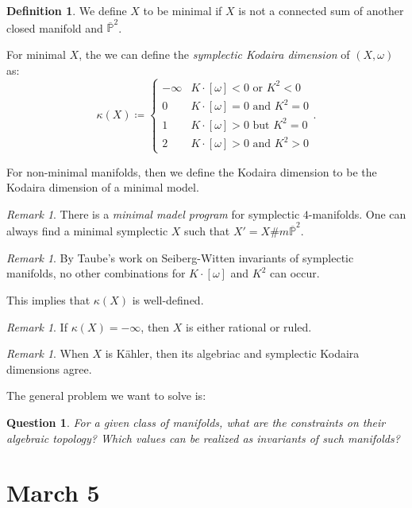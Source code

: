 \documentclass[leqno, openany]{memoir}
\newtheorem{quest}[thm]{Question}
\theoremstyle{definition}
\newtheorem{defn}[thm]{Definition}
\theoremstyle{remark}
\newtheorem{rmk}[thm]{Remark}
\theoremstyle{plain}
\theoremstyle{definition}
\theoremstyle{remark}
\renewcommand{\P}{\mathbb{P}}
\begin{document}
\begin{defn}
    We define $X$ to be minimal if $X$ is not a connected sum of another closed manifold and $\overline{\P}^2$.
\end{defn}

For minimal $X$, the we can define the \textit{symplectic Kodaira dimension} of $(X, \omega)$ as:
\[ \kappa(X) \coloneqq \begin{cases}
    - \infty & K \cdot [\omega] < 0 \text{ or } K^2 < 0 \\
    0 & K \cdot [\omega] = 0 \text{ and } K^2 = 0 \\
    1 & K \cdot [\omega] > 0 \text{ but } K^2 = 0 \\
    2 & K \cdot [\omega] > 0 \text{ and } K^2 > 0
\end{cases}. \]

For non-minimal manifolds, then we define the Kodaira dimension to be the Kodaira dimension of a minimal model.

\begin{rmk}
    There is a \textit{minimal madel program} for symplectic $4$-manifolds. One can always find a minimal symplectic $X$ such that $X' = X \# m \overline{\P}^2$.
\end{rmk}

\begin{rmk}
    By Taube's work on Seiberg-Witten invariants of symplectic manifolds, no other combinations for $K \cdot [\omega]$ and $K^2$ can occur.
\end{rmk}

This implies that $\kappa(X)$ is well-defined.

\begin{rmk}
    If $\kappa(X) = -\infty$, then $X$ is either rational or ruled.
\end{rmk}

\begin{rmk}
    When $X$ is K\"ahler, then its algebriac and symplectic Kodaira dimensions agree.
\end{rmk}

The general problem we want to solve is:
\begin{quest}
    For a given class of manifolds, what are the constraints on their algebraic topology? Which values can be realized as invariants of such manifolds?
\end{quest}


\chapter{March 5}%
\label{cha:march_5}
\end{document}
